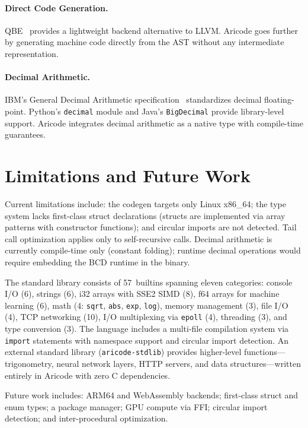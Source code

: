\documentclass[11pt,a4paper]{article}
\begin{document}
\paragraph{Direct Code Generation.}
QBE~\cite{qbe} provides a lightweight backend alternative to LLVM. Aricode goes further by generating machine code directly from the AST without any intermediate representation.

\paragraph{Decimal Arithmetic.}
IBM's General Decimal Arithmetic specification~\cite{ieee754r} standardizes decimal floating-point. Python's \texttt{decimal} module and Java's \texttt{BigDecimal} provide library-level support. Aricode integrates decimal arithmetic as a native type with compile-time guarantees.

\section{Limitations and Future Work}
\label{sec:future}

Current limitations include: the codegen targets only Linux x86\_64; the type system lacks first-class struct declarations (structs are implemented via array patterns with constructor functions); and circular imports are not detected. Tail call optimization applies only to self-recursive calls. Decimal arithmetic is currently compile-time only (constant folding); runtime decimal operations would require embedding the BCD runtime in the binary.

The standard library consists of 57~builtins spanning eleven categories: console I/O (6), strings (6), i32 arrays with SSE2 SIMD (8), f64 arrays for machine learning (6), math (4: \texttt{sqrt}, \texttt{abs}, \texttt{exp}, \texttt{log}), memory management (3), file I/O (4), TCP networking (10), I/O multiplexing via \texttt{epoll} (4), threading (3), and type conversion (3). The language includes a multi-file compilation system via \texttt{import} statements with namespace support and circular import detection. An external standard library (\texttt{aricode-stdlib}) provides higher-level functions---trigonometry, neural network layers, HTTP servers, and data structures---written entirely in Aricode with zero C dependencies.

Future work includes: ARM64 and WebAssembly backends; first-class struct and enum types; a package manager; GPU compute via FFI; circular import detection; and inter-procedural optimization.
\end{document}

